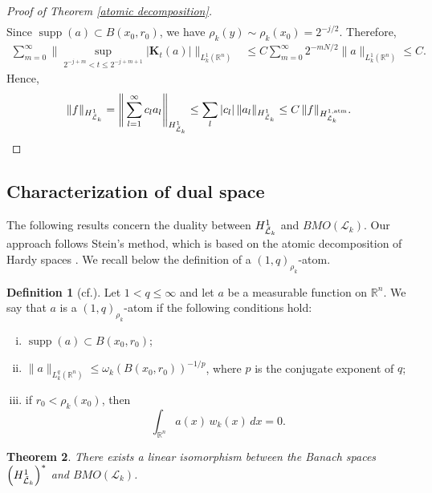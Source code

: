 \documentclass[11pt, reqno]{amsproc}
\newtheorem{theorem}{Theorem}[section]
\theoremstyle{definition}
\newtheorem{definition}[theorem]{Definition}
\theoremstyle{remark}
\numberwithin{equation}{section}
\begin{document}
\begin{proof}[Proof of Theorem \ref{atomic decomposition}]
\begin{align*}
     \end{align*}Since $\operatorname{supp}(a) \subset B(x_0, r_0)$, we have $\rho_k(y) \sim \rho_k(x_0) = 2^{-j/2}$. Therefore,
\begin{align*}
         \sum_{m=0}^\infty \Bigg\|  \sup_{ 2^{-j+m} <t \leq 2^{-j+m+1}}
         \big| \mathbf{K}_t(a) \big|
         \Bigg\|_{L_k^1(\mathbb{R}^n)}
         &\leq C \sum_{m=0}^\infty 2^{-mN/2}
         \|a\|_{L_k^1(\mathbb{R}^n)} \leq C.
\end{align*}
Hence,
\[
\|f\|_{H^1_{\Tilde{\mathcal{L}}_k}}
=
\Bigg\|
\sum_{l=1}^\infty c_l a_l
\Bigg\|_{H^1_{\Tilde{\mathcal{L}}_k}}
\leq
\sum_{l} |c_l| \,
\|a_l\|_{H^1_{\Tilde{\mathcal{L}}_k}}
\leq
C\,
\|f\|_{H_{\Tilde{\mathcal{L}}_k}^{1,\mathrm{atm}}}.
\]
\end{proof}



\subsection{Characterization of dual space}

The following results concern the duality between $H_{\Tilde{\mathcal{L}}_k}^1$ and $BMO(\mathcal{L}_k)$. 
Our approach follows Stein’s method, which is based on the atomic decomposition of Hardy spaces \cite{Stein-book-1}. 
We recall below the definition of a $(1,q)_{\rho_k}$-atom.
\begin{definition}[cf.\cite{Stein-book-1}]
Let $1<q\leq \infty$ and let $a$ be a measurable function on $\mathbb{R}^n$. 
We say that $a$ is a $(1,q)_{\rho_k}$-atom if the following conditions hold:
\begin{enumerate}[(i)]
\item $\operatorname{supp}(a)\subset B(x_0,r_0)$;
\item $\|a\|_{L_k^q(\mathbb{R}^n)} \le \omega_k(B(x_0,r_0))^{-1/p}$, 
where $p$ is the conjugate exponent of $q$;
\item if $r_0 < \rho_k(x_0)$, then
\[
\int_{\mathbb{R}^n} a(x)\,w_k(x)\,dx = 0.
\]
\end{enumerate}
\end{definition}

\begin{theorem}
    There exists a linear isomorphism between the Banach spaces $\left( H_{\Tilde{\mathcal{L}}_k}^1\right)^*$ and $BMO(\mathcal{L}_k)$.
\end{theorem}
\end{document}
